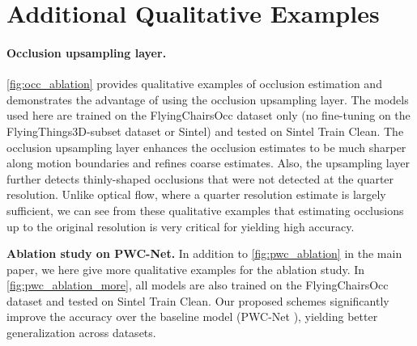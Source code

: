 \documentclass[10pt,twocolumn,letterpaper]{article}
\newcommand{\myparagraph}[1]{\medbreak\noindent\textbf{#1}}
\begin{document}
\begin{figure*}[t]
\begin{figure*}[t]
\begin{minipage}{0.245\textwidth}
{\begin{figure*}[!b]
\begin{tabular}{>{\centering\arraybackslash}m{} >{\centering\arraybackslash}m{} >{\centering\arraybackslash}m{} >{\centering\arraybackslash}m{}}
\end{tabular}
\caption {\color{black} \textbf{Qualitative examples of using the occlusion upsampling layer}: \emph{(a)} overlapped input images, \emph{(b)} occlusion ground truth, \emph{(c)} without using the occlusion upsampling layer, and \emph{(d)} with using the occlusion upsampling layer. The occlusion upsampling layer makes occlusion estimates much sharper along motion boundaries and detects additional thinly-shaped occlusions.}
\label{fig:occ_ablation}
\end{figure*}
}



\section{Additional Qualitative Examples}
\label{sec:qualitative}

\paragraph{Occlusion upsampling layer.} \cref{fig:occ_ablation} provides qualitative examples of occlusion estimation and demonstrates the advantage of using the occlusion upsampling layer. 
The models used here are trained on the FlyingChairsOcc dataset only (no fine-tuning on the FlyingThings3D-subset dataset or Sintel) and tested on Sintel Train Clean.
The occlusion upsampling layer enhances the occlusion estimates to be much sharper along motion boundaries and refines coarse estimates. 
Also, the upsampling layer further detects thinly-shaped occlusions that were not detected at the quarter resolution. 
Unlike optical flow, where a quarter resolution estimate is largely sufficient, we can see from these qualitative examples that estimating occlusions up to the original resolution is very critical for yielding high accuracy.


\myparagraph{Ablation study on PWC-Net.}
In addition to \cref{fig:pwc_ablation} in the main paper, we here give more qualitative examples for the ablation study.
In \cref{fig:pwc_ablation_more}, all models are also trained on the FlyingChairsOcc dataset and tested on Sintel Train Clean.
Our proposed schemes significantly improve the accuracy over the baseline model (\ie PWC-Net \cite{Sun:2017:PWC}), yielding better generalization across datasets.


{
\begin{figure*}[ht]
\centering
\footnotesize
\color{black}
\setlength\tabcolsep{0.3pt}
\renewcommand{\arraystretch}{0.2}
\begin{tabular}{>{\centering\arraybackslash}m{} >{\centering\arraybackslash}m{} >{\centering\arraybackslash}m{} >{\centering\arraybackslash}m{} >{\centering\arraybackslash}m{}}
	

\end{tabular}
\end{figure*}}
\end{minipage}
\end{figure*}
\end{figure*}
\end{document}
